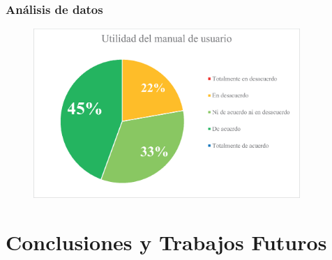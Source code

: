 \documentclass[9pt]{beamer}
\begin{document}
    \begin{frame}      
        \frametitle{Análisis de datos}
        \begin{figure}
            \centering
            \includegraphics[width=0.9\textwidth]{assets/Evaluacion/manual_utility.eps}
        \end{figure}
    \end{frame}

        

    \section{Conclusiones y Trabajos Futuros}
\end{document}
